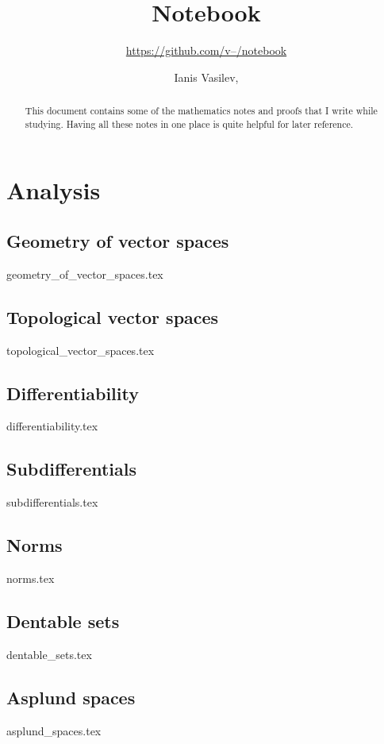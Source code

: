 \documentclass[numbers=endperiod, bibliography=totocnumbered]{scrartcl}
\title{Notebook}
\subtitle{\href{https://github.com/v--/notebook}{https://github.com/v--/notebook}}
\author{Ianis Vasilev, \Email{ianis@ivasilev.net}}
\date{}
\begin{document}
\sloppy

\maketitle

\begin{abstract}
  This document contains some of the mathematics notes and proofs that I write while studying. Having all these notes in one place is quite helpful for later reference.
\end{abstract}

\tableofcontents

\section{Analysis}\label{sec:analysis}
\subsection{Geometry of vector spaces}\label{sec:geometry_of_vector_spaces}
{geometry_of_vector_spaces.tex}
\subsection{Topological vector spaces}\label{sec:topological_vector_spaces}
{topological_vector_spaces.tex}
\subsection{Differentiability}\label{sec:differentiability}
{differentiability.tex}
\subsection{Subdifferentials}\label{sec:subdifferentials}
{subdifferentials.tex}
\subsection{Norms}\label{sec:norms}
{norms.tex}
\subsection{Dentable sets}\label{sec:dentable_sets}
{dentable_sets.tex}
\subsection{Asplund spaces}\label{sec:asplund_spaces}
{asplund_spaces.tex}
\end{document}
